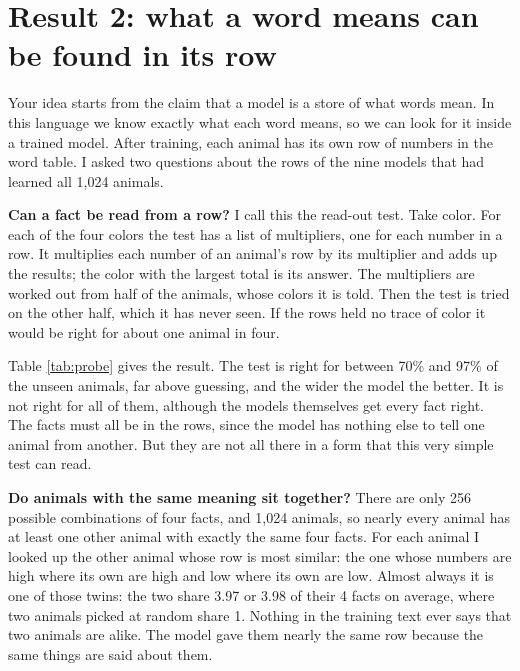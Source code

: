 

\section{Result 2: what a word means can be found in its row}\label{sec:probe}

Your idea starts from the claim that a model is a store of what words mean. In this language we
know exactly what each word means, so we can look for it inside a trained model. After training,
each animal has its own row of numbers in the word table. I asked two questions about the rows
of the nine models that had learned all 1,024 animals.

\textbf{Can a fact be read from a row?} I call this the read-out test. Take color. For each of
the four colors the test has a list of multipliers, one for each number in a row. It multiplies
each number of an animal's row by its multiplier and adds up the results; the color with the
largest total is its answer. The multipliers are worked out from half of the animals, whose
colors it is told. Then the test is tried on the other half, which it has never seen. If the
rows held no trace of color it would be right for about one animal in four.

\begin{table}[H]
\centering\small

\caption{Left four columns: how often the read-out test names the right value for animals it
was not worked out on, from their rows alone (average of the three repeats; guessing gives
25\%). Right column: how many of its four facts an animal shares with the animal whose row is
most like its own (two animals picked at random share 1.00).}
\label{tab:probe}
\end{table}

Table \ref{tab:probe} gives the result. The test is right for between 70\% and 97\% of the
unseen animals, far above guessing, and the wider the model the better. It is not right for all
of them, although the models themselves get every fact right. The facts must all be in the
rows, since the model has nothing else to tell one animal from another. But they are not all
there in a form that this very simple test can read.

\textbf{Do animals with the same meaning sit together?} There are only 256 possible
combinations of four facts, and 1,024 animals, so nearly every animal has at least one other
animal with exactly the same four facts. For each animal I looked up the other animal whose
row is most similar: the one whose numbers are high where its own are high and low where its
own are low. Almost always it is one of those twins: the two share 3.97 or 3.98 of their 4 facts on average, where two animals
picked at random share 1. Nothing in the training text ever says that two animals are alike.
The model gave them nearly the same row because the same things are said about them.

